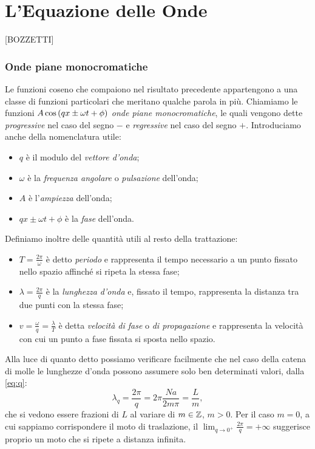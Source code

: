 \chapter{L'Equazione delle Onde}\label{ch:2}
[BOZZETTI]
\subsection{Onde piane monocromatiche}
        Le funzioni coseno che compaiono nel risultato precedente appartengono a una classe di funzioni particolari che meritano qualche parola in pi\`u. Chiamiamo le funzioni $A\cos\qty(qx\pm\omega t+\phi)$ \emph{onde piane monocromatiche}, le quali vengono dette \emph{progressive} nel caso del segno $-$ e \emph{regressive} nel caso del segno $+$. Introduciamo anche della nomenclatura utile\cite{Focardi2014-wy}:
        \begin{itemize}
            \item $q$ \`e il modulo del \emph{vettore d'onda};
            \item $\omega$ \`e la \emph{frequenza angolare} o \emph{pulsazione} dell'onda;
            \item $A$ \`e l'\emph{ampiezza} dell'onda;
            \item $qx\pm\omega t+\phi$ \`e la \emph{fase} dell'onda.
        \end{itemize}
        Definiamo inoltre delle quantit\`a utili al resto della trattazione:
        \begin{itemize}
            \item $\displaystyle T=\frac{2\pi}{\omega}$ \`e detto \emph{periodo} e rappresenta il tempo necessario a un punto fissato nello spazio affinch\'e si ripeta la stessa fase;
            \item $\displaystyle \lambda=\frac{2\pi}{q}$ \`e la \emph{lunghezza d'onda} e, fissato il tempo, rappresenta la distanza tra due punti con la stessa fase;
            \item $\displaystyle v=\frac{\omega}{q}=\frac{\lambda}{T}$ \`e detta \emph{velocit\`a di fase} o \emph{di propagazione} e rappresenta la velocit\`a con cui un punto a fase fissata si sposta nello spazio.
        \end{itemize}
        \par Alla luce di quanto detto possiamo verificare facilmente che nel caso della catena di molle le lunghezze d'onda possono assumere solo ben determinati valori, dalla \eqref{eq:q}: $$\lambda_q=\frac{2\pi}{q}=2\pi\frac{Na}{2m\pi}=\frac{L}{m},$$ che si vedono essere frazioni di $L$ al variare di $m\in\mathbb{Z}$, $m>0$. Per il caso $m=0$, a cui sappiamo corrispondere il moto di traslazione, il $\displaystyle\lim_{q\to 0^+}\frac{2\pi}{q}=+\infty$ suggerisce proprio un moto che si ripete a distanza infinita.
